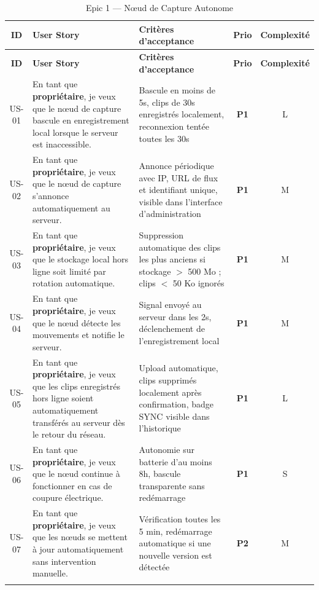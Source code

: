\documentclass[12pt,a4paper]{article}
\begin{document}
\begin{longtable}{|c|p{3.8cm}|p{6.3cm}|c|c|}
\hline
\textbf{ID} & \textbf{User Story} & \textbf{Critères d'acceptance} & \textbf{Prio} & \textbf{Complexité} \\
\hline
\endfirsthead
\hline
\textbf{ID} & \textbf{User Story} & \textbf{Critères d'acceptance} & \textbf{Prio} & \textbf{Complexité} \\
\hline
\endhead
US-01 & En tant que \textbf{propriétaire}, je veux que le nœud de capture bascule en enregistrement local lorsque le serveur est inaccessible. & Bascule en moins de 5s, clips de 30s enregistrés localement, reconnexion tentée toutes les 30s & \textbf{P1} & L \\
\hline
US-02 & En tant que \textbf{propriétaire}, je veux que le nœud de capture s'annonce automatiquement au serveur. & Annonce périodique avec IP, URL de flux et identifiant unique, visible dans l'interface d'administration & \textbf{P1} & M \\
\hline
US-03 & En tant que \textbf{propriétaire}, je veux que le stockage local hors ligne soit limité par rotation automatique. & Suppression automatique des clips les plus anciens si stockage $>$ 500 Mo ; clips $<$ 50 Ko ignorés & \textbf{P1} & M \\
\hline
US-04 & En tant que \textbf{propriétaire}, je veux que le nœud détecte les mouvements et notifie le serveur. & Signal envoyé au serveur dans les 2s, déclenchement de l'enregistrement local & \textbf{P1} & M \\
\hline
US-05 & En tant que \textbf{propriétaire}, je veux que les clips enregistrés hors ligne soient automatiquement transférés au serveur dès le retour du réseau. & Upload automatique, clips supprimés localement après confirmation, badge SYNC visible dans l'historique & \textbf{P1} & L \\
\hline
US-06 & En tant que \textbf{propriétaire}, je veux que le nœud continue à fonctionner en cas de coupure électrique. & Autonomie sur batterie d'au moins 8h, bascule transparente sans redémarrage & \textbf{P1} & S \\
\hline
US-07 & En tant que \textbf{propriétaire}, je veux que les nœuds se mettent à jour automatiquement sans intervention manuelle. & Vérification toutes les 5 min, redémarrage automatique si une nouvelle version est détectée & \textbf{P2} & M \\
\hline
\caption{Epic 1 --- Nœud de Capture Autonome}
\end{longtable}
\end{document}
